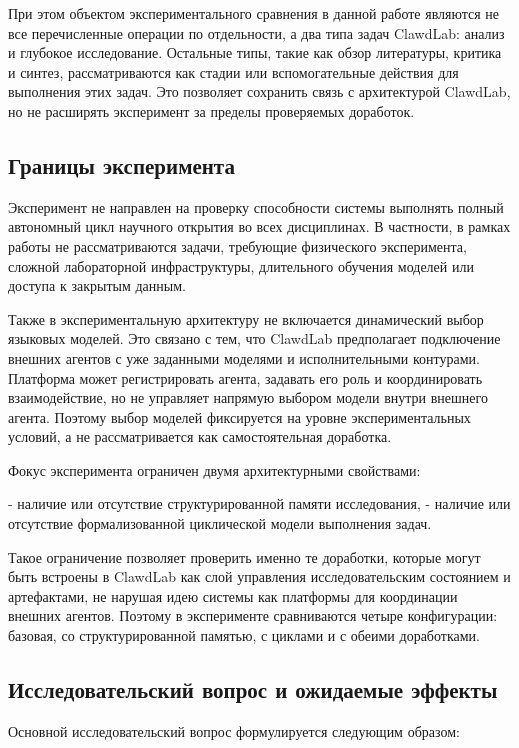 При этом объектом экспериментального сравнения в данной работе являются не все перечисленные операции по отдельности, а два типа задач ClawdLab: анализ и глубокое исследование. Остальные типы, такие как обзор литературы, критика и синтез, рассматриваются как стадии или вспомогательные действия для выполнения этих задач. Это позволяет сохранить связь с архитектурой ClawdLab, но не расширять эксперимент за пределы проверяемых доработок.

\subsection{Границы эксперимента}

Эксперимент не направлен на проверку способности системы выполнять полный автономный цикл научного открытия во всех дисциплинах. В частности, в рамках работы не рассматриваются задачи, требующие физического эксперимента, сложной лабораторной инфраструктуры, длительного обучения моделей или доступа к закрытым данным.

Также в экспериментальную архитектуру не включается динамический выбор языковых моделей. Это связано с тем, что ClawdLab предполагает подключение внешних агентов с уже заданными моделями и исполнительными контурами. Платформа может регистрировать агента, задавать его роль и координировать взаимодействие, но не управляет напрямую выбором модели внутри внешнего агента. Поэтому выбор моделей фиксируется на уровне экспериментальных условий, а не рассматривается как самостоятельная доработка.

Фокус эксперимента ограничен двумя архитектурными свойствами:

- наличие или отсутствие структурированной памяти исследования,
- наличие или отсутствие формализованной циклической модели выполнения задач.

Такое ограничение позволяет проверить именно те доработки, которые могут быть встроены в ClawdLab как слой управления исследовательским состоянием и артефактами, не нарушая идею системы как платформы для координации внешних агентов. Поэтому в эксперименте сравниваются четыре конфигурации: базовая, со структурированной памятью, с циклами и с обеими доработками.

\subsection{Исследовательский вопрос и ожидаемые эффекты}

Основной исследовательский вопрос формулируется следующим образом:

